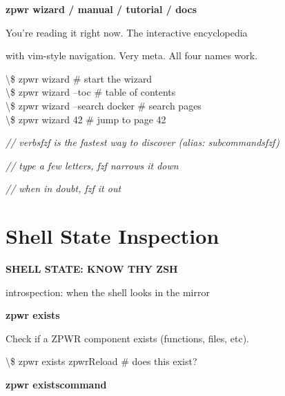 \documentclass[11pt,a4paper,twoside]{book}
\begin{document}
\vspace{12pt}
{\bfseries\color{neonyellow} zpwr wizard / manual / tutorial / docs}\vspace{4pt}

You're reading it right now. The interactive encyclopedia

with vim-style navigation. Very meta. All four names work.

\begin{codebox}
\textbackslash{}\$ zpwr wizard                 \# start the wizard\\
\textbackslash{}\$ zpwr wizard --toc           \# table of contents\\
\textbackslash{}\$ zpwr wizard --search docker  \# search pages\\
\textbackslash{}\$ zpwr wizard 42              \# jump to page 42\\
\end{codebox}

{\small\itshape\color{dimtext} // verbsfzf is the fastest way to discover (alias: subcommandsfzf)}

{\small\itshape\color{dimtext} // type a few letters, fzf narrows it down}

{\small\itshape\color{dimtext} // when in doubt, fzf it out}


\vspace{16pt}

\section{Shell State Inspection}


\vspace{10pt}
{\large\bfseries\color{neoncyan} SHELL STATE: KNOW THY ZSH}\vspace{6pt}

introspection: when the shell looks in the mirror


\vspace{12pt}
{\bfseries\color{neonyellow} zpwr exists}\vspace{4pt}

Check if a ZPWR component exists (functions, files, etc).

\begin{codebox}
\textbackslash{}\$ zpwr exists zpwrReload       \# does this exist?\\
\end{codebox}


\vspace{12pt}
{\bfseries\color{neonyellow} zpwr existscommand}\vspace{4pt}
\end{document}
